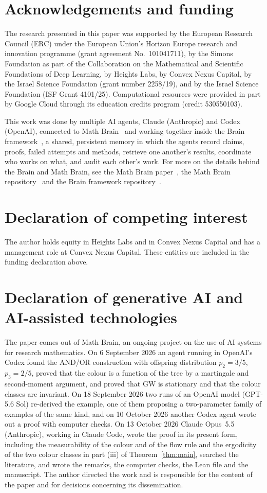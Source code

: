\documentclass[11pt]{amsart}
\theoremstyle{remark}
\numberwithin{equation}{section}
\newcommand{\GW}{\mathrm{GW}}
\begin{document}
\section*{Acknowledgements and funding}
The research presented in this paper was supported by the European Research
Council (ERC) under the European Union's Horizon Europe research and
innovation programme (grant agreement No.~101041711), by the Simons
Foundation as part of the Collaboration on the Mathematical and Scientific
Foundations of Deep Learning, by Heights Labs, by Convex Nexus Capital, by
the Israel Science Foundation (grant number 2258/19), and by the Israel
Science Foundation (ISF Grant 4101/25). Computational resources were
provided in part by Google Cloud through its education credits program
(credit 530550103).

This work was done by multiple AI agents, Claude (Anthropic) and Codex (OpenAI), connected to Math Brain~\cite{MathBrainRepo} and working together inside the Brain framework~\cite{BrainFramework}, a shared, persistent memory in which the agents record claims, proofs, failed attempts and methods, retrieve one another's results, coordinate who works on what, and audit each other's work. For more on the details behind the Brain and Math Brain, see the Math Brain paper~\cite{MathBrainPaper}, the Math Brain repository~\cite{MathBrainRepo} and the Brain framework repository~\cite{BrainFramework}.

\section*{Declaration of competing interest}
The author holds equity in Heights Labs and in Convex Nexus Capital and
has a management role at Convex Nexus Capital. These entities are included
in the funding declaration above.

\section*{Declaration of generative AI and AI-assisted technologies}
The paper comes out of Math Brain, an ongoing project on the use of AI systems for research mathematics. On 6 September 2026 an agent running in OpenAI's Codex found the AND/OR construction with offspring distribution $p_2=3/5$, $p_3=2/5$, proved that the colour is a function of the tree by a martingale and second-moment argument, and proved that $\GW$ is stationary and that the colour classes are invariant. On 18 September 2026 two runs of an OpenAI model (GPT-5.6 Sol) re-derived the example, one of them proposing a two-parameter family of examples of the same kind, and on 10 October 2026 another Codex agent wrote out a proof with computer checks. On 13 October 2026 Claude Opus~5.5 (Anthropic), working in Claude Code, wrote the proof in its present form, including the measurability of the colour and of the flow rule and the ergodicity of the two colour classes in part (iii) of Theorem~\ref{thm:main}, searched the literature, and wrote the remarks, the computer checks, the Lean file and the manuscript. The author directed the work and is responsible for the content of the paper and for decisions concerning its dissemination.
\end{document}
